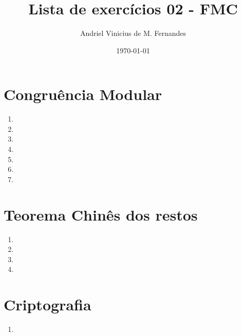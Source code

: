 \documentclass[12pt]{article}
\title{Lista de exercícios 02 - FMC}
\author{Andriel Vinicius de M. Fernandes}
\date{\today}
\begin{document}
\maketitle
\section{Congruência Modular}
\begin{enumerate}
	\item 
	\item 
	\item 
	\item 
	\item 
	\item 
	\item 
\end{enumerate}
\section{Teorema Chinês dos restos}
\begin{enumerate}
	\item 
	\item 
	\item 
	\item 
\end{enumerate}
\section{Criptografia}
\begin{enumerate}
	\item 
\end{enumerate}
\end{document}
